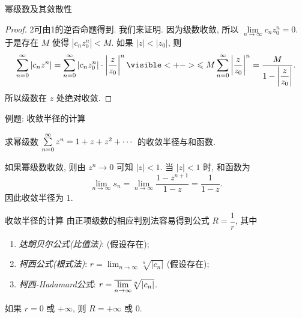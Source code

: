 \begin{frame}{幂级数及其敛散性}
\begin{center}
\end{center}
\onslide<+->
\begin{proof}
\enumnum2可由\enumnum1的逆否命题得到.
\onslide<+->
我们来证明. 因为级数收敛, 所以 $\lim\limits_{n\to\infty}c_n z_0^n=0$.
\onslide<+->
于是存在 $M$ 使得 $|c_nz_0^n|<M$.
\onslide<+->
如果 $|z|<|z_0|$, 则
\[\sum_{n=0}^\infty|c_nz^n|=\sum_{n=0}^\infty|c_nz_0^n|\cdot\abs{\frac z{z_0}}^n
\visible<+->{\le M\sum_{n=0}^\infty\abs{\frac z{z_0}}^n
=\frac{M}{1-\abs{\dfrac z{z_0}}}.}\]
\onslide<+->
所以级数在 $z$ 处绝对收敛.
\end{proof}
\end{frame}


\begin{frame}{例题: 收敛半径的计算}
\begin{example}
求幂级数 $\sum\limits_{n=0}^\infty z^n=1+z+z^2+\cdots$ 的收敛半径与和函数.
\end{example}
\begin{solution}
如果幂级数收敛, 则由 $z^n\to0$ 可知 $|z|<1$.
\onslide<+->
当 $|z|<1$ 时, 和函数为
\[\lim_{n\to\infty}s_n=\lim_{n\to\infty}\frac{1-z^{n+1}}{1-z}=\frac1{1-z}.\]
\onslide<+->
因此收敛半径为 $1$.
\end{solution}
\end{frame}


\begin{frame}{收敛半径的计算}
\onslide<+->
由正项级数的相应判别法容易得到公式 $R=\dfrac1r$, 其中
\begin{enumerate}
\item \emph{达朗贝尔公式(比值法)}:  (假设存在);
\item \emph{柯西公式(根式法)}: $r=\displaystyle\lim_{n\to\infty}\sqrt[n]{|c_n|}$ (假设存在);
\item \emph{柯西-Hadamard公式}: $r=\displaystyle\overline{\lim_{n\to\infty}} \sqrt[n]{|c_n|}$.
\end{enumerate}
\onslide<+->
如果 $r=0$ 或 $+\infty$, 则 $R=+\infty$ 或 $0$.
\end{frame}


